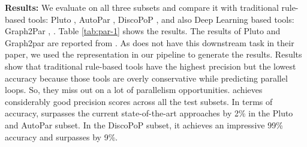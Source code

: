 \textbf{Results:}
We evaluate \ourtool on all three subsets and compare it with traditional rule-based tools: Pluto \cite{pluto}, AutoPar \cite{quinlan2011rose}, DiscoPoP \cite{li2015discopop}, and also Deep Learning based tools: Graph2Par \cite{chen2023learning}, \programl. Table \ref{tab:par-1} shows the results. The results of Pluto and Graph2par are reported from \cite{chen2023learning}. As \programl does not have this downstream task in their paper, we used the \programl representation in our pipeline to generate the results. Results show that traditional rule-based tools have the highest precision but the lowest accuracy because those tools are overly conservative while predicting parallel loops. So, they miss out on a lot of parallelism opportunities. \ourtool achieves considerably good precision scores across all the test subsets. In terms of accuracy, \ourtool surpasses the current state-of-the-art approaches by 2\% in the Pluto and AutoPar subset. In the DiscoPoP subset, it achieves an impressive 99\% accuracy and surpasses \programl by 9\%.
\vspace{-50pt}

